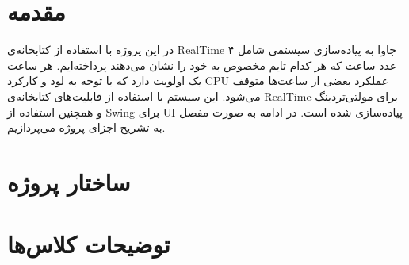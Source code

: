 \documentclass[oneside,a4paper,11pt]{report}
\begin{document}
	
	\patchcmd{\chapter}{\thispagestyle{plain}}{\thispagestyle{fancy}}{}{}
	
	
	\pagestyle{fancy}
	
	\lhead{}
	\rhead{\leftmark}
	\newpage
	
	\setcounter{secnumdepth}{0}
	\tableofcontents \newpage
	
	
	\section{مقدمه}
	در این پروژه با استفاده از کتابخانه‌ی RealTime جاوا به پیاده‌سازی سیستمی شامل ۴ عدد ساعت که هر کدام تایم مخصوص به خود را نشان می‌دهند پرداخته‌ایم. هر ساعت یک اولویت دارد که با توجه به لود و کارکرد CPU عملکرد بعضی از ساعت‌ها متوقف می‌شود. این سیستم با استفاده از قابلیت‌های کتابخانه‌ی RealTime برای مولتی‌تردینگ و همچنین استفاده از Swing برای UI پیاده‌سازی شده است. در ادامه به صورت مفصل به تشریح اجزای پروژه می‌پردازیم.
	
	
	\section{ساختار پروژه}
	
	\begin{latin}
		
	\end{latin}
	
	\section{توضیحات کلاس‌ها}
	
	\subsection{}
	
\end{document}
